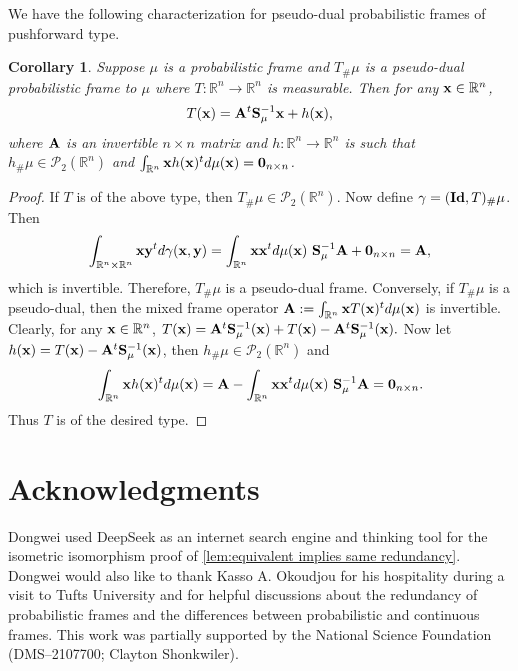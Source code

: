 \documentclass{amsart}
\numberwithin{equation}{section}
\theoremstyle{plain}
\newtheorem{corollary}[theorem]{Corollary}
\theoremstyle{remark}
\theoremstyle{definition}
\begin{document}
We have the following characterization for pseudo-dual probabilistic frames of pushforward type.
\begin{corollary}\label{cor:psuedodualpush}
    Suppose $\mu$ is a probabilistic frame and $T_\# \mu$ is a pseudo-dual probabilistic frame to $\mu$  where $T: \mathbb{R}^n \rightarrow \mathbb{R}^n$ is measurable. Then for any ${\bf x} \in \mathbb{R}^n$, 
    \begin{equation*}
        T({\bf x}) = {\bf A}^t{\bf S}_\mu^{-1}{\bf x} + h({\bf x}),
    \end{equation*}
    where $\bf A$ is an invertible $n \times n$ matrix and $h: \mathbb{R}^n \rightarrow \mathbb{R}^n$ is such that $h_\#\mu \in \mathcal{P}_2(\mathbb{R}^n)$ and $ \int_{\mathbb{R}^n } {\bf x} h({\bf x})^t d\mu({\bf x}) = {\bf 0}_{n \times n}$. 
\end{corollary}
\begin{proof}
 If $T$ is of the above type, then $T_\# \mu \in \mathcal{P}_2(\mathbb{R}^n)$. Now define $\gamma = ({\bf Id}, T)_\#\mu$. Then 
 $$\int_{\mathbb{R}^n \times \mathbb{R}^n} {\bf x} {\bf y}^t d\gamma({\bf x, y}) = \int_{\mathbb{R}^n } {\bf x} {\bf x}^t d\mu({\bf x}) \ {\bf S}_\mu^{-1} {\bf A} + {\bf 0}_{n \times n} = {\bf A}, $$ 
 which is invertible. Therefore,  $T_\# \mu$ is a pseudo-dual frame. Conversely, if $T_\# \mu$ is a pseudo-dual, then the mixed frame operator ${\bf A}:= \int_{\mathbb{R}^n } {\bf x} T({\bf x})^t d\mu({\bf x}) $ is invertible. Clearly, for any ${\bf x} \in \mathbb{R}^n$, 
    $T({\bf x}) = {\bf A}^t{\bf S}_\mu^{-1}({\bf x}) + T({\bf x}) - {\bf A}^t{\bf S}_\mu^{-1}({\bf x}).$
    Now let $h({\bf x}) = T({\bf x}) - {\bf A}^t{\bf S}_\mu^{-1}({\bf x})$, then $h_\#\mu \in \mathcal{P}_2(\mathbb{R}^n)$ and 
    $$\int_{\mathbb{R}^n } {\bf x} h({\bf x})^t d\mu({\bf x}) =  {\bf A} - \int_{\mathbb{R}^n } {\bf x} {\bf x}^t d\mu({\bf x}) \ {\bf S}_\mu^{-1} {\bf A} = {\bf 0}_{n \times n}.$$
    Thus $T$ is of the desired type.
\end{proof}


\section*{Acknowledgments}
Dongwei used DeepSeek as an internet search engine and thinking tool for the isometric isomorphism proof of \cref{lem:equivalent implies same redundancy}. Dongwei would also like to thank Kasso A. Okoudjou for his hospitality during a visit to Tufts University and for helpful discussions about the redundancy of probabilistic frames and the differences between probabilistic and continuous frames.
This work was partially supported by the National Science Foundation (DMS–2107700; Clayton Shonkwiler).

 

\end{document}
